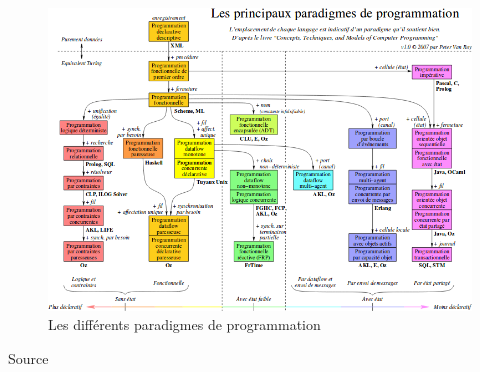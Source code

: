 \documentclass[a4paper,12pt]{article}
\begin{document}
\begin{figure}[h]

\begin{center}

\includegraphics[scale=0.5]{graph.png}

\end{center}
\label{paradigme}
\caption{Les différents paradigmes de programmation}


\end{figure}
Source\cite{para}
\end{document}
